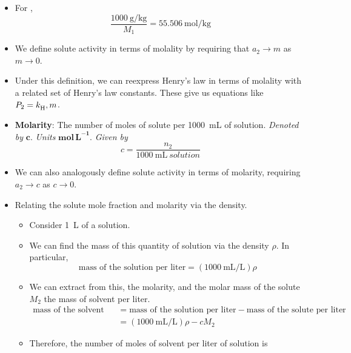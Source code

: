 \documentclass[../notes.tex]{subfiles}
\begin{document}
\begin{itemize}
\begin{itemize}
        \item We convert from the middle equation to the right equation by dividing both the top and bottom of the fraction by \SI{1000}{\gram}.
    \end{itemize}
    \item For ,
    \begin{equation*}
        \frac{\SI{1000}{\gram\per\kilo\gram}}{M_1} = \SI[per-mode=symbol]{55.506}{\mole\per\kilo\gram}
    \end{equation*}
    \item We define solute activity in terms of molality by requiring that $a_2\to m$ as $m\to 0$.
    \item Under this definition, we can reexpress Henry's law in terms of molality with a related set of Henry's law constants. These give us equations like $P_2={k_\text{H}^{}},m$.
    \item \textbf{Molarity}: The number of moles of solute per \SI{1000}{\milli\liter} of solution. \emph{Denoted by} $\bm{c}$. \emph{Units} $\textbf{mol}\,\textbf{L}^{\bm{-1}}$. \emph{Given by}
    \begin{equation*}
        c = \frac{n_2}{\SI{1000}{\milli\liter\ solution}}
    \end{equation*}
    \item We can also analogously define solute activity in terms of molarity, requiring $a_2\to c$ as $c\to 0$.
    \item Relating the solute mole fraction and molarity via the density.
    \begin{itemize}
        \item Consider \SI{1}{\liter} of a solution.
        \item We can find the mass of this quantity of solution via the density $\rho$. In particular,
        \begin{equation*}
            \text{mass of the solution per liter} = (\SI{1000}{\milli\liter\per\liter})\rho
        \end{equation*}
        \item We can extract from this, the molarity, and the molar mass of the solute $M_2$ the mass of solvent per liter.
        \begin{align*}
            \text{mass of the solvent per liter} &= \text{mass of the solution per liter}-\text{mass of the solute per liter}\\
            &= (\SI{1000}{\milli\liter\per\liter})\rho-cM_2
        \end{align*}
        \item Therefore, the number of moles of solvent per liter of solution is

\end{itemize}
\end{itemize}
\end{document}
